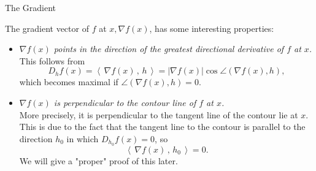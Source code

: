 \documentclass[smaller,hyperref={CJKbookmarks=true}]{beamer}
\newcommand{\scp}[2]{\left\langle\,#1\,,\,#2\,\right\rangle} \newcommand{\scpp}{\langle\,\cdot\,,\,\cdot\,\rangle}
\begin{document}
\begin{frame}[t]{The Gradient}
\begin{spacing}{1}
The gradient vector of $f$ at $x,\nabla f(x)$, has some interesting properties:
\begin{itemize}
  \item \emph{$\nabla f(x)$ points in the direction of the greatest directional derivative of $f$ at $x$.}\\[6pt]
      This follows from
      \[D_hf(x)=\scp{\nabla f(x)}{h}=|\nabla f(x)|\cos\angle(\nabla f(x),h),\]
      which becomes maximal if $\angle(\nabla f(x),h)=0$.
  \item \emph{$\nabla f(x)$ is perpendicular to the contour line of $f$ at $x$.}\\[6pt]
      More precisely, it is perpendicular to the tangent line of the contour lie at $x$. This is due to the fact that the tangent line to the contour is parallel to the direction $h_0$ in which $D_{h_0}f(x)=0$, so
      \[\scp{\nabla f(x)}{h_0}=0.\]
      We will give a "proper" proof of this later.
\end{itemize}
\end{spacing}
\end{frame}
\end{document}

